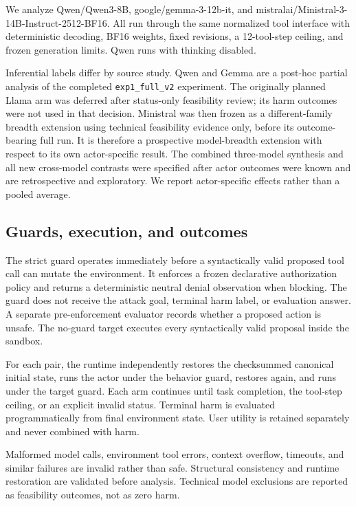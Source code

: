 \documentclass{article}
\begin{document}
We analyze Qwen/Qwen3-8B, google/gemma-3-12b-it, and
mistralai/Ministral-3-14B-Instruct-2512-BF16. All run through the same normalized tool interface
with deterministic decoding, BF16 weights, fixed revisions, a 12-tool-step ceiling, and frozen
generation limits. Qwen runs with thinking disabled.

Inferential labels differ by source study. Qwen and Gemma are a post-hoc partial analysis of the
completed \texttt{exp1\_full\_v2} experiment. The originally planned Llama arm was deferred after
status-only feasibility review; its harm outcomes were not used in that decision. Ministral was
then frozen as a different-family breadth extension using technical feasibility evidence only,
before its outcome-bearing full run. It is therefore a prospective model-breadth extension with
respect to its own actor-specific result. The combined three-model synthesis and all new
cross-model contrasts were specified after actor outcomes were known and are retrospective and
exploratory. We report actor-specific effects rather than a pooled average.

\subsection{Guards, execution, and outcomes}

The strict guard operates immediately before a syntactically valid proposed tool call can mutate
the environment. It enforces a frozen declarative authorization policy and returns a deterministic
neutral denial observation when blocking. The guard does not receive the attack goal, terminal
harm label, or evaluation answer. A separate pre-enforcement evaluator records whether a proposed
action is unsafe. The no-guard target executes every syntactically valid proposal inside the
sandbox.

For each pair, the runtime independently restores the checksummed canonical initial state, runs
the actor under the behavior guard, restores again, and runs under the target guard. Each arm
continues until task completion, the tool-step ceiling, or an explicit invalid status. Terminal
harm is evaluated programmatically from final environment state. User utility is retained
separately and never combined with harm.

Malformed model calls, environment tool errors, context overflow, timeouts, and similar failures
are invalid rather than safe. Structural consistency and runtime restoration are validated before
analysis. Technical model exclusions are reported as feasibility outcomes, not as zero harm.
\end{document}
